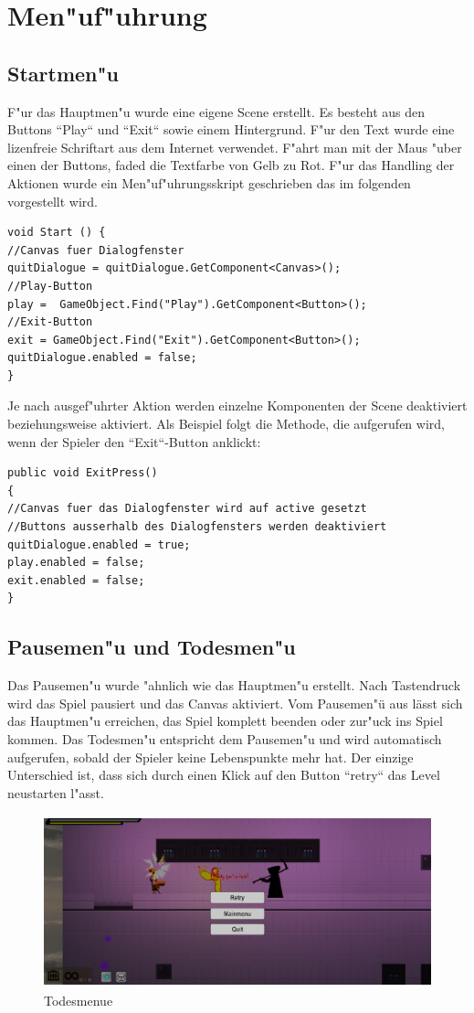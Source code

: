 \chapter{Men"uf"uhrung}
\section{Startmen"u}
F"ur das Hauptmen"u wurde eine eigene Scene erstellt. Es besteht aus den Buttons ``Play`` und ``Exit`` sowie einem Hintergrund. F"ur den Text wurde eine lizenfreie Schriftart aus dem Internet verwendet. F"ahrt man mit der Maus "uber einen der Buttons, faded die Textfarbe von Gelb zu Rot. \newline
\newline
F"ur das Handling der Aktionen wurde ein Men"uf"uhrungsskript geschrieben das im folgenden vorgestellt wird.

\begin{lstlisting}[breaklines=true]
void Start () {
//Canvas fuer Dialogfenster
quitDialogue = quitDialogue.GetComponent<Canvas>();
//Play-Button
play =  GameObject.Find("Play").GetComponent<Button>();
//Exit-Button
exit = GameObject.Find("Exit").GetComponent<Button>();
quitDialogue.enabled = false;
}
\end{lstlisting}

Je nach ausgef"uhrter Aktion werden einzelne Komponenten der Scene deaktiviert beziehungsweise aktiviert. 
Als Beispiel folgt die Methode, die aufgerufen wird, wenn der Spieler den ``Exit``-Button anklickt:

\begin{lstlisting}[breaklines=true]
public void ExitPress()
{
//Canvas fuer das Dialogfenster wird auf active gesetzt
//Buttons ausserhalb des Dialogfensters werden deaktiviert
quitDialogue.enabled = true;
play.enabled = false;
exit.enabled = false;
}
\end{lstlisting}
\newpage
\section{Pausemen"u und Todesmen"u}
Das Pausemen"u wurde "ahnlich wie das Hauptmen"u erstellt. Nach Tastendruck wird das Spiel pausiert und das Canvas aktiviert. Vom Pausemen"ü aus lässt sich das Hauptmen"u erreichen, das Spiel komplett beenden oder zur"uck ins Spiel kommen. 
\newline
Das Todesmen"u entspricht dem Pausemen"u und wird automatisch aufgerufen, sobald der Spieler keine Lebenspunkte mehr hat. Der einzige Unterschied ist, dass sich durch einen Klick auf den Button ``retry`` das Level neustarten l"asst. 

\begin{figure}
	\centering
	\includegraphics[height=5cm]{images/Todesmenu.png}
	\caption{Todesmenue}
	\label{fig:Todesmenue}
\end{figure}
